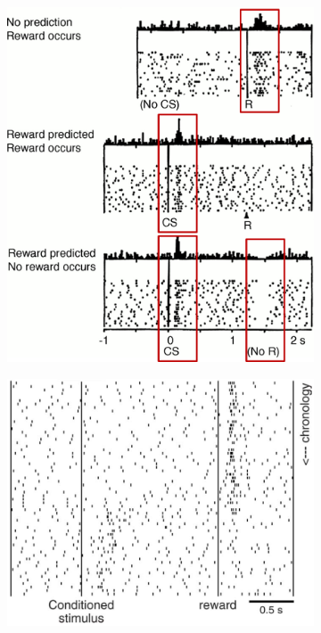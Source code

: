 \begin{description}
\begin{description}
\begin{casestudy}
                    \begin{figure}[H]
                        \centering
                        \begin{subfigure}{0.48\linewidth}
                            \centering
                            \includegraphics[width=0.8\linewidth]{../module1/img/dopamine_transfer_cs.png}
                        \end{subfigure}
                        \begin{subfigure}{0.48\linewidth}
                            \centering
                            \includegraphics[width=0.9\linewidth]{./img/dopamine_transfer.png}
                        \end{subfigure}
                    \end{figure}
                \end{casestudy}



\end{description}
\end{description}

